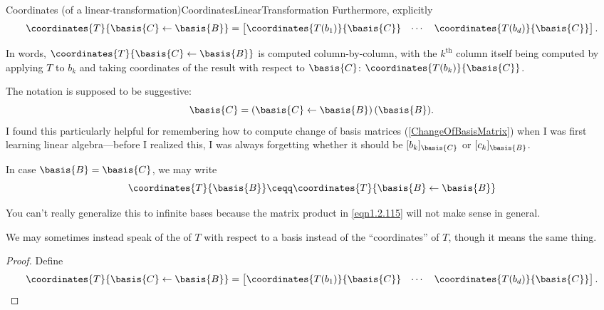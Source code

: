 \begin{thm}{Coordinates (of a linear-transform\-ation)}{CoordinatesLinearTransformation}
	Furthermore, explicitly
	\begin{equation}\label{eqnCoordinatesLinearTransformation}
		\coordinates{T}{\basis{C}\leftarrow \basis{B}}=\begin{bmatrix}\coordinates{T(b_1)}{\basis{C}} & \cdots & \coordinates{T(b_d)}{\basis{C}}\end{bmatrix}.
	\end{equation}
	\begin{rmk}
		In words, $\coordinates{T}{\basis{C}\leftarrow \basis{B}}$ is computed column-by-column, with the $k^{\text{th}}$ column itself being computed by applying $T$ to $b_k$ and taking coordinates of the result with respect to $\basis{C}$:  $\coordinates{T(b_k)}{\basis{C}}$.
	\end{rmk}
	\begin{rmk}
		The notation is supposed to be suggestive:
		\begin{equation}
			\basis{C}=(\basis{C}\leftarrow \basis{B})\, (\basis{B}).
		\end{equation}
		I found this particularly helpful for remembering how to compute change of basis matrices (\cref{ChangeOfBasisMatrix}) when I was first learning linear algebra---before I realized this, I was always forgetting whether it should be $[b_k]_{\basis{C}}$ or $[c_k]_{\basis{B}}$.
	\end{rmk}
	\begin{rmk}
		In case $\basis{B}=\basis{C}$, we may write
		\begin{equation}
			\coordinates{T}{\basis{B}}\ceqq \coordinates{T}{\basis{B}\leftarrow \basis{B}}
		\end{equation}
	\end{rmk}
	\begin{rmk}
		You can't really generalize this to infinite bases because the matrix product in \eqref{eqn1.2.115} will not make sense in general.
	\end{rmk}
	\begin{rmk}
		We may sometimes instead speak of the  of $T$ with respect to a basis instead of the ``coordinates'' of $T$, though it means the same thing.
	\end{rmk}
	\begin{proof}
		Define
		\begin{equation}
			\coordinates{T}{\basis{C}\leftarrow \basis{B}}=\begin{bmatrix}\coordinates{T(b_1)}{\basis{C}} & \cdots & \coordinates{T(b_d)}{\basis{C}}\end{bmatrix}.
		\end{equation}
		

\end{proof}
\end{thm}
